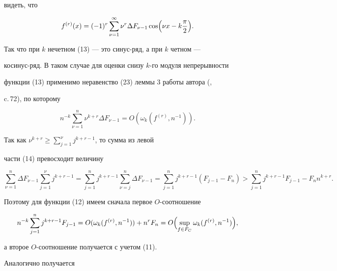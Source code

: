\begin{pf}
видеть, что


\begin{equation}


f^{(r)}(x)=(-1)^r\sum^\infty_{\nu=1}\nu^r\Delta F_{\nu-1}


\cos\Bigl(\nu x-k\frac{\pi}{2}\Bigr).


\end{equation}


Так что при $k$ нечетном (13) --- это синус-ряд, а при $k$ четном ---


косинус-ряд. В таком случае для оценки снизу $k$-го модуля непрерывности


функции (13) применимо неравенство (23) леммы 3 работы автора (\cite{Ge1},


c.\,72), по которому


\begin{equation}


n^{-k}\sum^n_{\nu=1}\nu^{k+r}\Delta F_{\nu-1}=


O(\omega_k(f^{(r)},n^{-1})).


\end{equation}


Так как $\nu^{k+r}\ge\sum\limits^\nu_{j=1}j^{k+r-1}$, то сумма из левой


части (14) превосходит величину


$$


\sum^n_{\nu=1}\Delta F_{\nu-1}\sum^\nu_{j=1}j^{k+r-1}


=\sum^n_{j=1}j^{k+r-1}\sum^n_{\nu=j}\Delta F_{\nu-1}=


\sum^n_{j=1}j^{k+r-1}(F_{j-1}-F_n)>\sum^n_{j=1}j^{k+r-1}


F_{j-1}-F_n n^{k+r}.


$$


Поэтому для функции (12) имеем сначала первое $O$-соотношение


$$


n^{-k}\sum^n_{j=1}j^{k+r-1}F_{j-1}=O(\omega_k(f^{(r)},n^{-1}))


+n^rF_n=O\Bigl(\sup_{f\in F_C}\omega_k(f^{(r)},n^{-1})\Bigr),


$$


а второе $O$-соотношение получается с учетом (11).


\end{pf}





Аналогично получается





